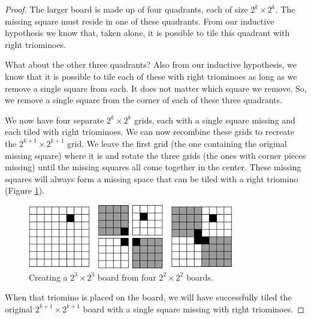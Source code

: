 \documentclass[10pt,letter]{article}
\begin{document}
\begin{proof}
The larger board is made up of four quadrants, each of size $2^k \times 2^k$. The missing square must reside in one of these quadrants. From our inductive hypothesis we know that, taken alone, it is possible to tile this quadrant with right triominoes. 

What about the other three quadrants? Also from our inductive hypothesis, we know that it is possible to tile each of these with right triominoes as long as we remove a single square from each. It does not matter which square we remove. So, we remove a single square from the corner of each of these three quadrants.

We now have four separate $2^k \times 2^k$ grids, each with a single square missing and each tiled with right triominoes. We can now recombine these grids to recreate the $2^{k+1} \times 2^{k+1}$ grid. We leave the first grid (the one containing the original missing square) where it is and rotate the three grids (the ones with corner pieces missing) until the missing squares all come together in the center. These missing squares will always form a missing space that can be tiled with a right triomino (Figure \ref{fig:tile_proof}).

\begin{figure}[h]
    \centering
    \includegraphics[width=0.8\textwidth]{rightTriominoesProof.png}
    \caption{Creating a $2^3 \times 2^3$ board from four $2^2 \times 2^2$ boards.}
    \label{fig:tile_proof}
\end{figure}

When that triomino is placed on the board, we will have successfully tiled the original $2^{k+1} \times 2^{k+1}$ board with a single square missing with right triominoes.

\end{proof}
\end{document}
